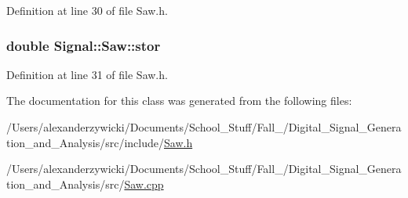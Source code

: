 Definition at line 30 of file Saw.\+h.

\hypertarget{class_signal_1_1_saw_a7c038cabed8c0b51136f16794c9142fd}{
\subsubsection[{stor}]{\setlength{\rightskip}{0pt plus 5cm}double Signal\+::\+Saw\+::stor\hspace{0.3cm}{\ttfamily [protected]}}}\label{class_signal_1_1_saw_a7c038cabed8c0b51136f16794c9142fd}


Definition at line 31 of file Saw.\+h.



The documentation for this class was generated from the following files\+:\begin{DoxyCompactItemize}
\item 
/\+Users/alexanderzywicki/\+Documents/\+School\+\_\+\+Stuff/\+Fall\+\_/\+Digital\+\_\+\+Signal\+\_\+\+Generation\+\_\+and\+\_\+\+Analysis/src/include/\hyperlink{_saw_8h}{Saw.\+h}\item 
/\+Users/alexanderzywicki/\+Documents/\+School\+\_\+\+Stuff/\+Fall\+\_/\+Digital\+\_\+\+Signal\+\_\+\+Generation\+\_\+and\+\_\+\+Analysis/src/\hyperlink{_saw_8cpp}{Saw.\+cpp}\end{DoxyCompactItemize}
